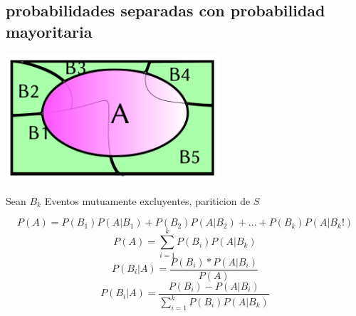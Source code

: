 	\subsection{probabilidades separadas con probabilidad mayoritaria}
	\begin{center}

	\includegraphics[width=8cm]{3.png}

	Sean $B_k$ Eventos mutuamente excluyentes, pariticion de $S$

	\end{center}
	$$P(A) = P(B_1)P(A|B_1) + P(B_2)P(A|B_2) + ... + P(B_k)P(A|B_k!)$$
	$$P(A) = \sum_{i=1}^{k}P(B_i)P(A|B_k)$$
	$$P(B_i|A) = \frac{ P(B_i)*P(A|B_i) }{ P(A) } $$
	$$P(B_i|A) = \frac{P(B_i) - P(A|B_i)}{\sum\limits_{i=1}^{k}P(B_i)P(A|B_k)}$$





